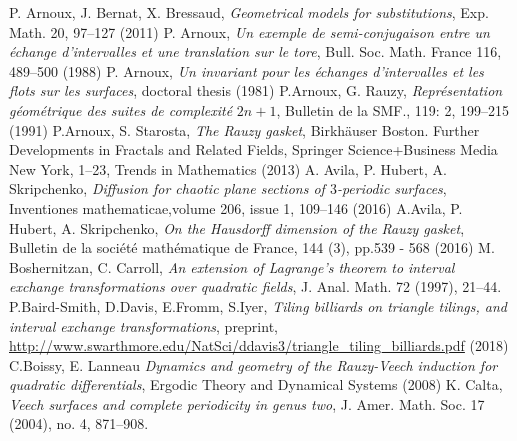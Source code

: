 \documentclass[12pt]{article}
\theoremstyle{definition}
\begin{document}
%


\begin{thebibliography}{99}
 P. Arnoux, J. Bernat, X. Bressaud, \emph{Geometrical models for substitutions}, Exp. Math. 20, 97–127 (2011)
 P. Arnoux, \emph{Un exemple de semi-conjugaison entre un \'{e}change d’intervalles et une translation sur le tore}, Bull. Soc. Math. France 116, 489--500 (1988)
 P. Arnoux, \emph{Un invariant pour les échanges d'intervalles et les flots sur les surfaces}, doctoral thesis (1981)
 P.Arnoux, G. Rauzy, \emph{Représentation géométrique des suites de complexité }$2n+1$, Bulletin de la SMF., 119: 2, 199--215 (1991)
 P.Arnoux, S. Starosta, \emph{The Rauzy gasket}, Birkhäuser Boston. Further Developments in Fractals and Related Fields, Springer Science+Business Media New York, 1--23, Trends in Mathematics (2013)
 A. Avila, P. Hubert, A. Skripchenko, \emph{Diffusion for chaotic plane sections of $3$-periodic surfaces}, Inventiones mathematicae,volume 206, issue 1, 109--146 (2016)
 A.Avila, P. Hubert, A. Skripchenko, \emph{On the Hausdorff dimension of the Rauzy gasket}, Bulletin de la société mathématique de France, 144 (3), pp.539 - 568 (2016)
 M. Boshernitzan, C. Carroll, \emph{ An extension of Lagrange's theorem to interval exchange transformations over quadratic fields}, J. Anal. Math. 72 (1997), 21--44.
 P.Baird-Smith, D.Davis, E.Fromm, S.Iyer, \emph{Tiling billiards on triangle tilings, and interval exchange transformations}, preprint, \url{http://www.swarthmore.edu/NatSci/ddavis3/triangle_tiling_billiards.pdf} (2018)
 C.Boissy, E. Lanneau \emph{Dynamics and geometry of the Rauzy-Veech induction for quadratic differentials}, Ergodic Theory and Dynamical Systems (2008)
 K. Calta, \emph{ Veech surfaces and complete periodicity in genus two}, J. Amer. Math. Soc. 17 (2004), no. 4, 871--908.


\end{thebibliography}
\end{document}
